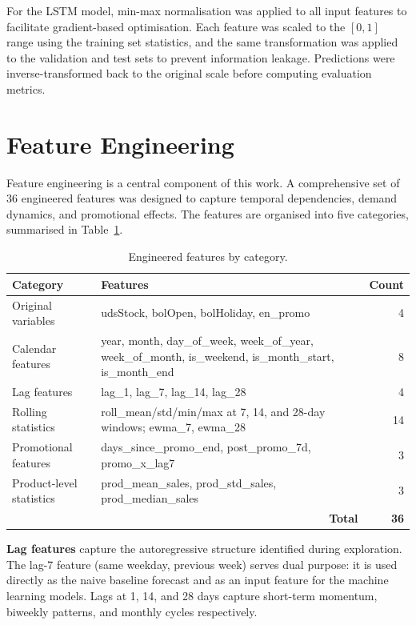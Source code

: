 For the LSTM model, min-max normalisation was applied to all input features to facilitate gradient-based optimisation. Each feature was scaled to the $[0, 1]$ range using the training set statistics, and the same transformation was applied to the validation and test sets to prevent information leakage. Predictions were inverse-transformed back to the original scale before computing evaluation metrics.

\clearpage
\section{Feature Engineering}

Feature engineering is a central component of this work. A comprehensive set of 36 engineered features was designed to capture temporal dependencies, demand dynamics, and promotional effects. The features are organised into five categories, summarised in Table~\ref{tab:features}.

\begin{table}[H]
\centering
\small
\caption{Engineered features by category.}
\label{tab:features}
\begin{tabular}{|l|p{7cm}|r|}
\hline
\textbf{Category} & \textbf{Features} & \textbf{Count} \\
\hline
Original variables & udsStock, bolOpen, bolHoliday, en\_promo & 4 \\
\hline
Calendar features & year, month, day\_of\_week, week\_of\_year, week\_of\_month, is\_weekend, is\_month\_start, is\_month\_end & 8 \\
\hline
Lag features & lag\_1, lag\_7, lag\_14, lag\_28 & 4 \\
\hline
Rolling statistics & roll\_mean/std/min/max at 7, 14, and 28-day windows; ewma\_7, ewma\_28 & 14 \\
\hline
Promotional features & days\_since\_promo\_end, post\_promo\_7d, promo\_x\_lag7 & 3 \\
\hline
Product-level statistics & prod\_mean\_sales, prod\_std\_sales, prod\_median\_sales & 3 \\
\hline
\multicolumn{2}{|r|}{\textbf{Total}} & \textbf{36} \\
\hline
\end{tabular}
\end{table}

\textbf{Lag features} capture the autoregressive structure identified during exploration. The lag-7 feature (same weekday, previous week) serves dual purpose: it is used directly as the naive baseline forecast and as an input feature for the machine learning models. Lags at 1, 14, and 28 days capture short-term momentum, biweekly patterns, and monthly cycles respectively.

